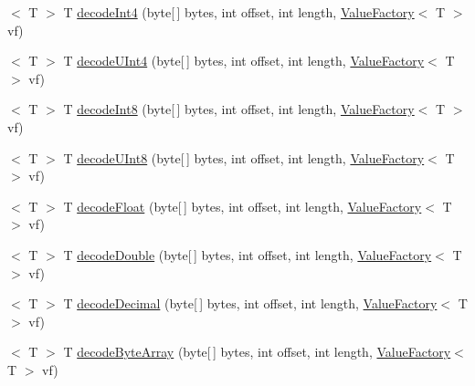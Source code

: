 \begin{DoxyCompactItemize}
\item 
$<$ T $>$ T \mbox{\hyperlink{interfacecom_1_1mysql_1_1cj_1_1protocol_1_1_value_decoder_a6236420972df8897f8ccedd437bfdd7d}{decode\+Int4}} (byte\mbox{[}$\,$\mbox{]} bytes, int offset, int length, \mbox{\hyperlink{interfacecom_1_1mysql_1_1cj_1_1result_1_1_value_factory}{Value\+Factory}}$<$ T $>$ vf)
\item 
$<$ T $>$ T \mbox{\hyperlink{interfacecom_1_1mysql_1_1cj_1_1protocol_1_1_value_decoder_a7f79158fa5e70cfb237a32a43a79b29a}{decode\+U\+Int4}} (byte\mbox{[}$\,$\mbox{]} bytes, int offset, int length, \mbox{\hyperlink{interfacecom_1_1mysql_1_1cj_1_1result_1_1_value_factory}{Value\+Factory}}$<$ T $>$ vf)
\item 
$<$ T $>$ T \mbox{\hyperlink{interfacecom_1_1mysql_1_1cj_1_1protocol_1_1_value_decoder_a59cd56f90ab86eab7f0108f20b73f108}{decode\+Int8}} (byte\mbox{[}$\,$\mbox{]} bytes, int offset, int length, \mbox{\hyperlink{interfacecom_1_1mysql_1_1cj_1_1result_1_1_value_factory}{Value\+Factory}}$<$ T $>$ vf)
\item 
$<$ T $>$ T \mbox{\hyperlink{interfacecom_1_1mysql_1_1cj_1_1protocol_1_1_value_decoder_aa27f53c4c6f0933ac3a74a90c3071297}{decode\+U\+Int8}} (byte\mbox{[}$\,$\mbox{]} bytes, int offset, int length, \mbox{\hyperlink{interfacecom_1_1mysql_1_1cj_1_1result_1_1_value_factory}{Value\+Factory}}$<$ T $>$ vf)
\item 
$<$ T $>$ T \mbox{\hyperlink{interfacecom_1_1mysql_1_1cj_1_1protocol_1_1_value_decoder_af0d9ab928fea5ae9f99dcf97296a00ee}{decode\+Float}} (byte\mbox{[}$\,$\mbox{]} bytes, int offset, int length, \mbox{\hyperlink{interfacecom_1_1mysql_1_1cj_1_1result_1_1_value_factory}{Value\+Factory}}$<$ T $>$ vf)
\item 
$<$ T $>$ T \mbox{\hyperlink{interfacecom_1_1mysql_1_1cj_1_1protocol_1_1_value_decoder_ad58ceda1ebe3f6dac6384aa2d75a252d}{decode\+Double}} (byte\mbox{[}$\,$\mbox{]} bytes, int offset, int length, \mbox{\hyperlink{interfacecom_1_1mysql_1_1cj_1_1result_1_1_value_factory}{Value\+Factory}}$<$ T $>$ vf)
\item 
$<$ T $>$ T \mbox{\hyperlink{interfacecom_1_1mysql_1_1cj_1_1protocol_1_1_value_decoder_a674c684fca16f098e37f69d6aadb6373}{decode\+Decimal}} (byte\mbox{[}$\,$\mbox{]} bytes, int offset, int length, \mbox{\hyperlink{interfacecom_1_1mysql_1_1cj_1_1result_1_1_value_factory}{Value\+Factory}}$<$ T $>$ vf)
\item 
$<$ T $>$ T \mbox{\hyperlink{interfacecom_1_1mysql_1_1cj_1_1protocol_1_1_value_decoder_aeb1bd23aa0b1f9c71fd15b0eda8dc242}{decode\+Byte\+Array}} (byte\mbox{[}$\,$\mbox{]} bytes, int offset, int length, \mbox{\hyperlink{interfacecom_1_1mysql_1_1cj_1_1result_1_1_value_factory}{Value\+Factory}}$<$ T $>$ vf)

\end{DoxyCompactItemize}
